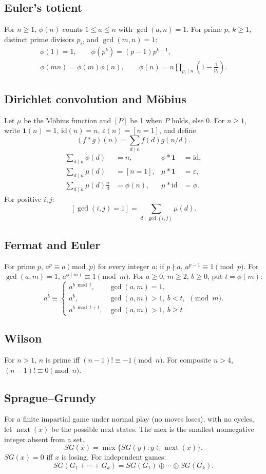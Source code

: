 \subsection{Euler's totient}
For $n\ge1$, $\phi(n)$ counts $1\le a\le n$ with $\gcd(a,n)=1$.
For prime $p$, $k\ge1$, distinct prime divisors $p_i$, and $\gcd(m,n)=1$:
\[
\begin{gathered}
\phi(1)=1,\qquad \phi(p^k)=(p-1)p^{k-1},\\
\phi(mn)=\phi(m)\phi(n),\qquad
\phi(n)=n\prod_{p_i\mid n}\left(1-\frac1{p_i}\right).
\end{gathered}
\]

\subsection{Dirichlet convolution and M\"obius}
Let $\mu$ be the M\"obius function and $[P]$ be 1 when $P$ holds, else 0.
For $n\ge1$, write $\mathbf1(n)=1$, $\mathrm{id}(n)=n$,
$\varepsilon(n)=[n=1]$, and define
\[
(f*g)(n)=\sum_{d\mid n}f(d)g(n/d).
\]
\[
\begin{aligned}
\sum_{d\mid n}\phi(d)&=n,&\phi*\mathbf1&=\mathrm{id},\\
\sum_{d\mid n}\mu(d)&=[n=1],&\mu*\mathbf1&=\varepsilon,\\
\sum_{d\mid n}\mu(d)\frac nd&=\phi(n),&\mu*\mathrm{id}&=\phi.
\end{aligned}
\]
For positive $i,j$:
\[
[\gcd(i,j)=1]=\sum_{d\mid\gcd(i,j)}\mu(d).
\]

\subsection{Fermat and Euler}
For prime $p$, $a^p\equiv a\pmod p$ for every integer $a$;
if $p\nmid a$, $a^{p-1}\equiv1\pmod p$.
For $\gcd(a,m)=1$, $a^{\phi(m)}\equiv1\pmod m$.
For $a\ge0$, $m\ge2$, $b\ge0$, put $t=\phi(m)$:
\[
a^b\equiv
\begin{cases}
a^{b\bmod t},&\gcd(a,m)=1,\\
a^b,&\gcd(a,m)>1,\ b<t,\\
a^{b\bmod t+t},&\gcd(a,m)>1,\ b\ge t
\end{cases}\pmod m.
\]

\subsection{Wilson}
For $n>1$, $n$ is prime iff $(n-1)!\equiv-1\pmod n$.
For composite $n>4$, $(n-1)!\equiv0\pmod n$.

\subsection{Sprague--Grundy}
For a finite impartial game under normal play (no moves loses),
with no cycles, let $\operatorname{next}(x)$ be the possible next states.
The mex is the smallest nonnegative integer absent from a set.
\[
SG(x)=\operatorname{mex}\{SG(y):y\in\operatorname{next}(x)\}.
\]
$SG(x)=0$ iff $x$ is losing. For independent games:
\[
SG(G_1+\cdots+G_k)=SG(G_1)\mathbin{\oplus}\cdots\mathbin{\oplus}SG(G_k).
\]

